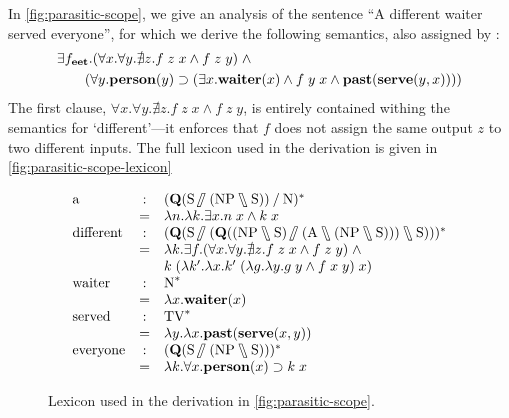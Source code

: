 In \autoref{fig:parasitic-scope}, we give an analysis of the sentence
``A different waiter served everyone'', for which we derive the
following semantics, also assigned by \citeauthor{kiselyov2015b}:
\begin{align*}
  &\exists{f_{\ensuremath{\mathbf{e}}\ensuremath{\mathbf{e}}\ensuremath{\mathbf{t}}}}.(\forall{x}.\forall{y}.\nexists{z}.f\;z\;x\wedge{f\;z\;y})\;\wedge\\
  &\qquad(\forall{y}.\mathbf{person}(y)\supset(\exists{x}.\mathbf{waiter}(x)\wedge{f\;y\;x\wedge\ensuremath{\mathbf{past}}(\ensuremath{\mathbf{serve}}(y,x))}))
\end{align*}
The first clause, $\forall{x}.\forall{y}.\nexists{z}.f\;z\;x\wedge
{f\;z\;y}$, is entirely contained withing the semantics for
`different'---it enforces that $f$ does not assign the same output $z$
to two different inputs. The full lexicon used in the derivation is
given in \autoref{fig:parasitic-scope-lexicon}
\begin{figure}[hb]
  \centering
  \begin{mdframed}
    \[
      \renewcommand*{\arraystretch}{1}
      \begin{array}{l c l}
        \text{a}
        &:& \tr[{(\q[\S\himpl(\NP\himpr\S)]\impl\N)}]\\
        &=& \lambda n. \lambda k. \exists x. n\;x\wedge k\;x\\

        \text{different}
        &:& \tr[{(\q[\S\himpl(\q[(\NP\himpr\S)\himpl(\A\himpr(\NP\himpr\S))]\himpr\S)])}]\\
        &=& \lambda k. \exists f. (\forall x.\forall y.\nexists z.f\;z\;x\wedge f\;z\;y)\;\wedge\\
        & & k\;(\lambda k'.\lambda x.k'\;(\lambda g.\lambda y.g\;y\wedge f\;x\;y)\;x)\\

        \text{waiter}
        &:& \tr[\N]\\
        &=& \lambda x.\WAITER(x)\\

        \text{served}
        &:& \tr[\TV]\\
        &=& \lambda y.\lambda x.\PAST(\SERVE(x,y))\\

        \text{everyone}
        &:& \tr[{(\q[\S\himpl(\NP\himpr\S)])}]\\
        &=& \lambda k.\forall x.\PERSON(x)\supset k\;x
      \end{array}
    \]
  \end{mdframed}
  \caption{Lexicon used in the derivation in \autoref{fig:parasitic-scope}.}
  \label{fig:parasitic-scope-lexicon}
\end{figure}
%

%


